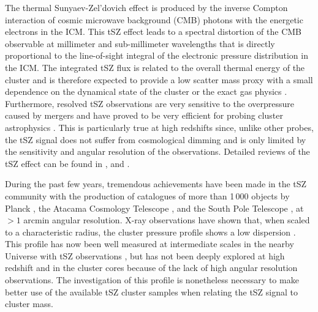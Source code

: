 \documentclass[traditabstract]{aa}
\begin{document}
The thermal Sunyaev-Zel'dovich effect \citep[tSZ;][]{sunyaev1972,sunyaev1980} is produced by the inverse Compton interaction of cosmic microwave background (CMB) photons with the energetic electrons in the ICM. This tSZ effect leads to a spectral distortion of the CMB observable at millimeter and sub-millimeter wavelengths that is directly proportional to the line-of-sight integral of the electronic pressure distribution in the ICM. The integrated tSZ flux is related to the overall thermal energy of the cluster and is therefore expected to provide a low scatter mass proxy with a small dependence on the dynamical state of the cluster or the exact gas physics \citep[e.g.,][]{dasilva2004,motl2005,nagai2006}. Furthermore, resolved tSZ observations are very sensitive to the overpressure caused by mergers and have proved to be very efficient for probing cluster astrophysics \citep[see, for example, results by][]{pointecouteau1999,komatsu2001,korngut2011,adam2013,young2014,adam2014,mroczkowski2015}. This is particularly true at high redshifts since, unlike other probes, the tSZ signal does not suffer from cosmological dimming and is only limited by the sensitivity and angular resolution of the observations. Detailed reviews of the tSZ effect can be found in \cite{birkinshaw1999,carlstrom2002}, and \cite{kitayama2014}.

During the past few years, tremendous achievements have been made in the tSZ community with the production of catalogues of more than 1\,000 objects by Planck \citep{planck2013catalogue}, the Atacama Cosmology Telescope \citep[ACT;][]{hasselfield2013}, and the South Pole Telescope \citep[SPT;][]{reichardt2013,bleem2014}, at $>1$ arcmin angular resolution. X-ray observations have shown that, when  scaled to a characteristic radius, the cluster pressure profile shows a low dispersion \citep{arnaud2010}. This profile has now been well measured at intermediate scales in the nearby Universe with tSZ observations \citep{plagge2010,planck2013pressure_profile,sayers2013b}, but has not been deeply explored at high redshift and in the cluster cores because of the lack of high angular resolution observations. The investigation of this profile is nonetheless necessary to make better use of the available tSZ cluster samples when relating the tSZ signal to cluster mass.
\end{document}
